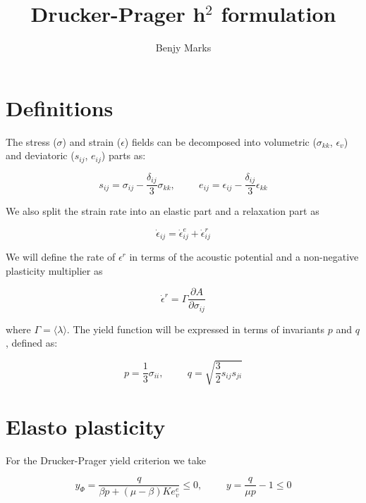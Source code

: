 \documentclass[a4paper]{article}
\begin{document}
\title{Drucker-Prager h$^2$ formulation}
\author{Benjy Marks}
\maketitle

\section{Definitions}

The stress ($\sigma$) and strain ($\epsilon$) fields can be decomposed into volumetric ($\sigma_{kk}$, $\epsilon_v$) and deviatoric ($s_{ij}$, $e_{ij}$) parts as:

\begin{equation}
s_{ij}=\sigma_{ij}-\frac{\delta_{ij}}{3}\sigma_{kk},\hspace{1cm}e_{ij}=\epsilon_{ij}-\frac{\delta_{ij}}{3}\epsilon_{kk}
\end{equation}

We also split the strain rate into an elastic part and a relaxation part as

\begin{equation}
\dot\epsilon_{ij} = \dot\epsilon^e_{ij} + \dot\epsilon^r_{ij}
\end{equation}

We will define the rate of $\epsilon^r$ in terms of the acoustic potential and a non-negative plasticity multiplier as

\begin{equation}
\dot\epsilon^r = \Gamma\frac{\partial A}{\partial\sigma_{ij}}
\end{equation}

where $\Gamma = \langle\lambda\rangle$. The yield function will be expressed in terms of invariants $p$ and $q$, defined as:

\begin{equation}
p=\frac{1}{3}\sigma_{ii},\hspace{1cm}q=\sqrt{\frac{3}{2}s_{ij}s_{ji}}
\end{equation}

\section{Elasto plasticity}

For the Drucker-Prager yield criterion we take

\begin{equation}
y_{\Phi} = \frac{q}{\beta p + (\mu-\beta)Ke_v^e}\le0,\hspace{1cm}y = \frac{q}{\mu p} -1 \le 0
\end{equation}
\end{document}
